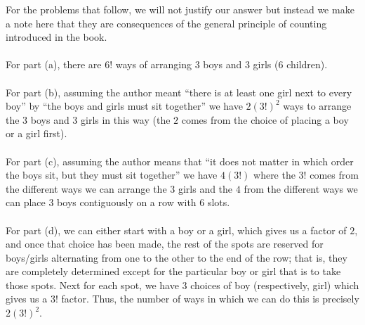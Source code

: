 \begin{solution*}
  For the problems that follow, we will not justify our answer but instead
  we make a note here that they are consequences of the general principle
  of counting introduced in the book.
  \\\\
  For part (a), there are \(6!\) ways of arranging \(3\) boys and \(3\)
  girls (\(6\) children).
  \\\\
  For part (b), assuming the author meant ``there is at least one girl next
  to every boy'' by ``the boys and girls must sit together'' we have
  \(2(3!)^2\) ways to arrange the \(3\) boys and \(3\) girls in this way
  (the \(2\) comes from the choice of placing a boy or a girl first).
  \\\\
  For part (c), assuming the author means that ``it does not matter in
  which order the boys sit, but they must sit together'' we have \(4(3!)\)
  where the \(3!\) comes from the different ways we can arrange the \(3\)
  girls and the \(4\) from the different ways we can place \(3\) boys
  contiguously on a row with \(6\) slots.
  \\\\
  For part (d), we can either start with a boy or a girl, which gives us a
  factor of \(2\), and once that choice has been made, the rest of the
  spots are reserved for boys/girls alternating from one to the other to
  the end of the row; that is, they are completely determined except for
  the particular boy or girl that is to take those spots. Next for each
  spot, we have \(3\) choices of boy (respectively, girl) which gives us a
  \(3!\) factor. Thus, the number of ways in which we can do this is
  precisely \(2(3!)^2\).
\end{solution*}

